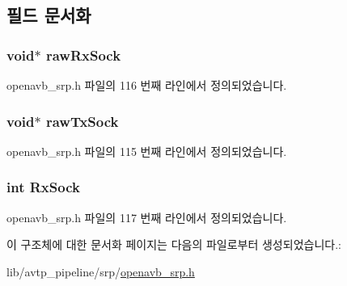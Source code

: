 \subsection{필드 문서화}
\subsubsection[{\texorpdfstring{raw\+Rx\+Sock}{rawRxSock}}]{\setlength{\rightskip}{0pt plus 5cm}void$\ast$ raw\+Rx\+Sock}\hypertarget{structopenavb_srp_sock_info_a75adac221edbb38584cbc6bcb490c980}{}\label{structopenavb_srp_sock_info_a75adac221edbb38584cbc6bcb490c980}


openavb\+\_\+srp.\+h 파일의 116 번째 라인에서 정의되었습니다.

\subsubsection[{\texorpdfstring{raw\+Tx\+Sock}{rawTxSock}}]{\setlength{\rightskip}{0pt plus 5cm}void$\ast$ raw\+Tx\+Sock}\hypertarget{structopenavb_srp_sock_info_afa78e0081e95ac5aefc91dbd6926ebf1}{}\label{structopenavb_srp_sock_info_afa78e0081e95ac5aefc91dbd6926ebf1}


openavb\+\_\+srp.\+h 파일의 115 번째 라인에서 정의되었습니다.

\subsubsection[{\texorpdfstring{Rx\+Sock}{RxSock}}]{\setlength{\rightskip}{0pt plus 5cm}int Rx\+Sock}\hypertarget{structopenavb_srp_sock_info_a39ee207b080c577f803c932136fbf85f}{}\label{structopenavb_srp_sock_info_a39ee207b080c577f803c932136fbf85f}


openavb\+\_\+srp.\+h 파일의 117 번째 라인에서 정의되었습니다.



이 구조체에 대한 문서화 페이지는 다음의 파일로부터 생성되었습니다.\+:\begin{DoxyCompactItemize}
\item 
lib/avtp\+\_\+pipeline/srp/\hyperlink{openavb__srp_8h}{openavb\+\_\+srp.\+h}\end{DoxyCompactItemize}
